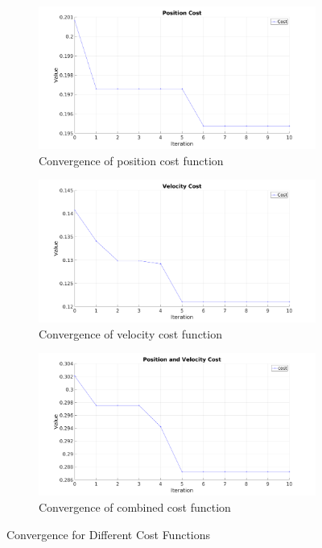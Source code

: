 \begin{figure}[ht]
    \begin{subfigure}{0.5\textwidth}
        \centering
        \includegraphics[width=0.9\linewidth]{images/controllers/pos_cost.png}
        \caption[Position cost function]{Convergence of position cost function}
        \label{fig:pos_cost}
    \end{subfigure}
    \begin{subfigure}{0.5\textwidth}
        \centering
        \includegraphics[width=0.9\linewidth]{images/controllers/vel_cost.png}
        \caption[Velocity cost function]{Convergence of velocity cost function}
        \label{fig:vel_cost}
    \end{subfigure}

    \begin{subfigure}{\textwidth}
        \centering
        \includegraphics[width=0.45\linewidth]{images/controllers/all_cost.png}
        \caption[Combined cost function]{Convergence of combined cost function}
        \label{fig:all_cost}
    \end{subfigure}
    \caption[Convergence for Different Cost Functions]{Convergence for Different Cost Functions}
    \label{fig:cost_function_optimization}
\end{figure}


